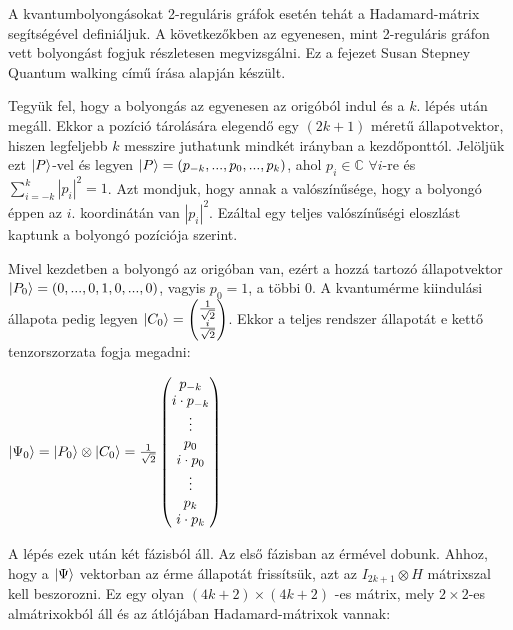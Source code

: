 A kvantumbolyongásokat 2-reguláris gráfok esetén tehát a Hadamard-mátrix
segítségével definiáljuk. A következőkben az egyenesen, mint 2-reguláris gráfon
vett bolyongást fogjuk részletesen megvizsgálni. Ez a fejezet Susan Stepney
Quantum walking című írása \cite{Stepney} alapján készült.

Tegyük fel, hogy a bolyongás az egyenesen az origóból indul és a $k.$ lépés
után megáll. Ekkor a pozíció tárolására elegendő egy $(2k+1)$ méretű
állapotvektor, hiszen legfeljebb $k$ messzire juthatunk mindkét irányban a
kezdőponttól. Jelöljük ezt $\ket{P}$-vel és legyen $\ket{P}=(p_{-k}, ..., p_0,
  ..., p_{k})$, ahol $p_i\in\mathds{C}$ $\forall i$-re és $\sum\limits_{i=-k}^{k}
  |p_i|^2 = 1$. Azt mondjuk, hogy annak a valószínűsége, hogy a bolyongó éppen az
$i.$ koordinátán van $|p_i|^2$. Ezáltal egy teljes valószínűségi eloszlást
kaptunk a bolyongó pozíciója szerint.

Mivel kezdetben a bolyongó az origóban van, ezért a hozzá tartozó állapotvektor
$\ket{P_0} = (0, ..., 0, 1, 0, ..., 0)$, vagyis $p_0=1$, a többi $0$. A kvantumérme
kiindulási állapota pedig legyen $\ket{C_0} = \begin{pmatrix} \frac{1}{\sqrt{2}} \\
    \frac{i}{\sqrt{2}}\end{pmatrix}$. Ekkor a teljes rendszer állapotát e kettő
tenzorszorzata fogja megadni:

\begin{center}
  $\ket{\Psi_0} = \ket{P_0} \otimes \ket{C_0}
    = \frac{1}{\sqrt{2}} \begin{pmatrix}
      p_{-k}         \\
      i\cdot{}p_{-k} \\
      \vdots         \\
      p_{0}          \\
      i\cdot{}p_{0}  \\
      \vdots         \\
      p_{k}          \\
      i\cdot{}p_{k}
    \end{pmatrix}
  $
\end{center}

A lépés ezek után két fázisból áll. Az első fázisban az érmével dobunk. Ahhoz, hogy
a $\ket{\Psi}$ vektorban az érme állapotát frissítsük, azt az $I_{2k+1} \otimes H$
mátrixszal kell beszorozni. Ez egy olyan $(4k+2) \times (4k+2)$ -es mátrix, mely
$2 \times 2$-es almátrixokból áll és az átlójában Hadamard-mátrixok vannak:

